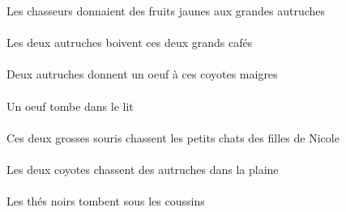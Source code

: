 \begin{exe}
Les chasseurs donnaient des fruits jaunes aux grandes autruches
\ex\gll
\DEFDuErg{}   \autrucheDDuErg{}   \DEMDuAbs{}   \grandDDu{}   \cafeDDuAbs{}  \boireVtPrsDDu{}\\
\DEFDuErgP{}   \autrucheDDuErgP{}   \DEMDuAbsP{}   \grandDDuP{}   \cafeDDuAbsP{}  \boireVtPrsDDuP{}\\
Les deux autruches boivent ces deux grands cafés
\ex\gll
\INDDuErg{}   \autrucheDDuErg{}    \DEMPlDat{}   \maigreAPl{}   \coyoteAPlDat{}   \INDSgAbs{}   \oeufDSgAbs{}  \donnerVdPrsDSg{}\\
\INDDuErgP{}   \autrucheDDuErgP{}    \DEMPlDatP{}   \maigreAPlP{}   \coyoteAPlDatP{}   \INDSgAbsP{}   \oeufDSgAbsP{}  \donnerVdPrsDSgP{}\\
Deux autruches donnent un oeuf à ces coyotes maigres
\ex\gll
\INDSgAbs{}   \oeufDSgAbs{}    \DEFSgObl{}   \litDSgObl{}   \DANS{}  \tomberViPrsDSg{}\\
\INDSgAbsP{}   \oeufDSgAbsP{}    \DEFSgOblP{}   \litDSgOblP{}   \DANSP{}  \tomberViPrsDSgP{}\\
Un oeuf tombe dans le lit
\ex\gll
\DEMDuErg{}   \grosADu{}   \sourisADuErg{}   \DEFPlAbs{}    \DEFPlObl{}    \INDSgObl{}   \NicoleDSgObl{}   \DE{}   \filleCPlObl{}   \DE{}   \petitDPl{}   \chatDPlAbs{}  \chasserVtPrsDPl{}\\
\DEMDuErgP{}   \grosADuP{}   \sourisADuErgP{}   \DEFPlAbsP{}    \DEFPlOblP{}    \INDSgOblP{}   \NicoleDSgOblP{}   \DEP{}   \filleCPlOblP{}   \DEP{}   \petitDPlP{}   \chatDPlAbsP{}  \chasserVtPrsDPlP{}\\
Ces deux grosses souris chassent les petits chats des filles de Nicole
\ex\gll
\DEFSgObl{}   \plaineCSgObl{}   \DANS{}   \DEFDuErg{}   \coyoteADuErg{}   \INDPlAbs{}   \autrucheDPlAbs{}  \chasserVtPrsDPl{}\\
\DEFSgOblP{}   \plaineCSgOblP{}   \DANSP{}   \DEFDuErgP{}   \coyoteADuErgP{}   \INDPlAbsP{}   \autrucheDPlAbsP{}  \chasserVtPrsDPlP{}\\
Les deux coyotes chassent des autruches dans la plaine
\ex\gll
\DEFPlAbs{}   \noirBPl{}   \theBPlAbs{}    \DEFPlObl{}   \coussinAPlObl{}   \SOUS{}  \tomberViPrsBPl{}\\
\DEFPlAbsP{}   \noirBPlP{}   \theBPlAbsP{}    \DEFPlOblP{}   \coussinAPlOblP{}   \SOUSP{}  \tomberViPrsBPlP{}\\
Les thés noirs tombent sous les coussins
\ex\gll
\DEFDuErg{}   \jauneDDu{}   \chatDDuErg{}    \DEFSgObl{}   \petitCSg{}   \cuisineCSgObl{}   \DANS{}   \DEFPlAbs{}    \DEFSgObl{}   \maisonDSgObl{}   \DE{}   \sourisAPlAbs{}  \chasserVtPrsAPl{}\\

\end{exe}
